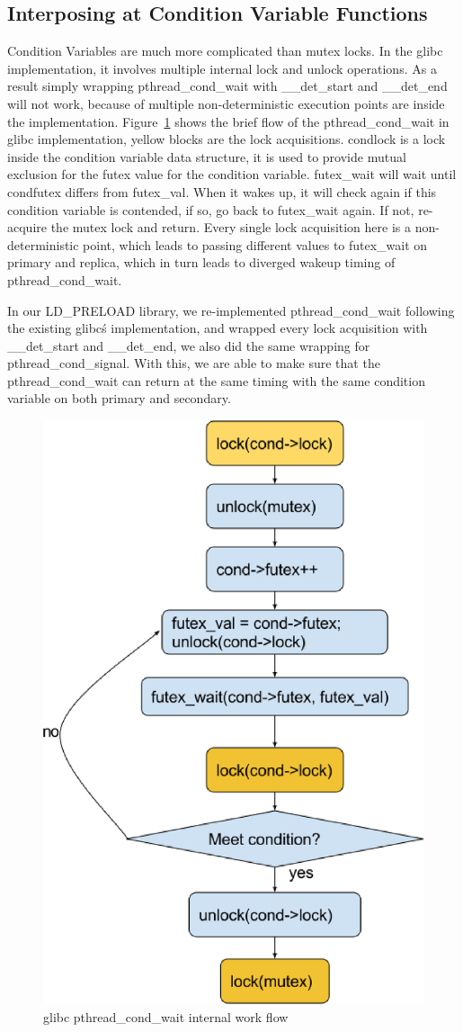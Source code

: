 \subsection{Interposing at Condition Variable Functions}

Condition Variables are much more complicated than mutex locks. In the glibc implementation, it involves multiple internal lock and unlock operations. As a result simply wrapping pthread\_cond\_wait with \_\_det\_start and \_\_det\_end will not work, because of multiple non-deterministic execution points are inside the implementation. Figure~\ref{f:cond_wait} shows the brief flow of the pthread\_cond\_wait in glibc implementation, yellow blocks are the lock acquisitions. cond\textrightarrow lock is a lock inside the condition variable  data structure, it is used to provide mutual exclusion for the futex value for the condition variable. futex\_wait will wait until cond\textrightarrow futex differs from futex\_val. When it wakes up, it will check again if this condition variable is contended, if so, go back to futex\_wait again. If not, re-acquire the mutex lock and return. Every single lock acquisition here is a non-deterministic point, which leads to passing different values to futex\_wait on primary and replica, which in turn leads to diverged wakeup timing of pthread\_cond\_wait.

\newpage

In our LD\_PRELOAD library, we re-implemented pthread\_cond\_wait following the existing glibc\'s implementation, and wrapped every lock acquisition with \_\_det\_start and \_\_det\_end, we also did the same wrapping for pthread\_cond\_signal. With this, we are able to make sure that the pthread\_cond\_wait can return at the same timing with the same condition variable on both primary and secondary.


\begin{figure}
\centering
\includegraphics[width=0.4\columnwidth]{figures/cond_wait}
\caption{glibc pthread\_cond\_wait internal work flow}
\label{f:cond_wait}
\end{figure}

